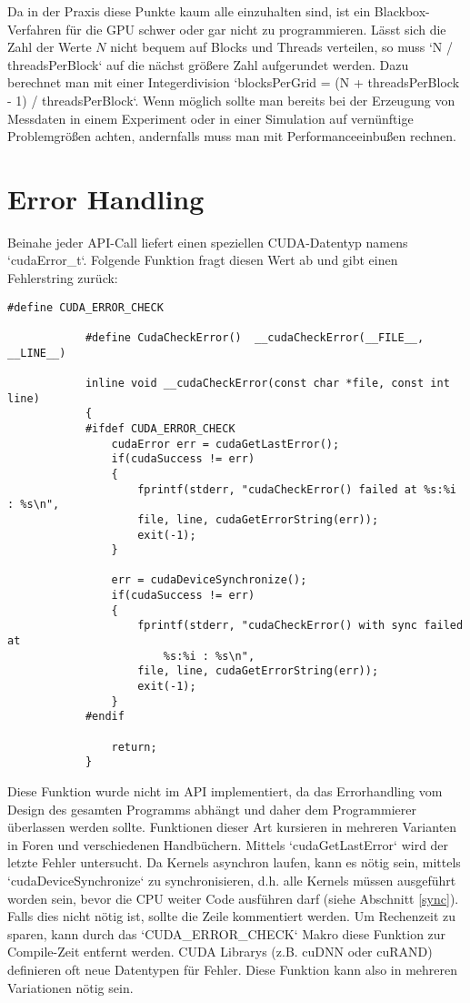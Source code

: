         Da in der Praxis diese Punkte kaum alle einzuhalten sind, ist ein Blackbox-Verfahren für die GPU schwer oder gar nicht zu programmieren. Lässt sich die Zahl der Werte $N$ nicht bequem auf \Glspl{Block} und \Glspl{Thread} verteilen, so muss \li`N / threadsPerBlock` auf die nächst größere Zahl aufgerundet werden. Dazu berechnet man mit einer Integerdivision \li`blocksPerGrid = (N + threadsPerBlock - 1) / threadsPerBlock`. Wenn möglich sollte man bereits bei der Erzeugung von Messdaten in einem Experiment oder in einer Simulation auf vernünftige Problemgrößen achten, andernfalls muss man mit \Gls{Performance}einbußen rechnen.
        								
		\section{Error Handling}
		Beinahe jeder \Gls{API}-Call liefert einen speziellen CUDA-Datentyp namens \li`cudaError_t`. Folgende Funktion fragt diesen Wert ab und gibt einen Fehlerstring zurück:		
		\begin{lstlisting}[caption=~Error Handling]
			#define CUDA_ERROR_CHECK

			#define CudaCheckError()  __cudaCheckError(__FILE__, __LINE__)

			inline void __cudaCheckError(const char *file, const int line)
			{
			#ifdef CUDA_ERROR_CHECK
				cudaError err = cudaGetLastError();
				if(cudaSuccess != err)
				{
					fprintf(stderr, "cudaCheckError() failed at %s:%i : %s\n",
					file, line, cudaGetErrorString(err));
					exit(-1);
				}

    			err = cudaDeviceSynchronize();
    			if(cudaSuccess != err)
    			{
        			fprintf(stderr, "cudaCheckError() with sync failed at 
        				%s:%i : %s\n",
					file, line, cudaGetErrorString(err));
					exit(-1);
				}
			#endif

				return;
			}
		\end{lstlisting}
		
		Diese Funktion wurde nicht im \Gls{API} implementiert, da das Errorhandling vom Design des gesamten Programms abhängt und daher dem Programmierer überlassen werden sollte. Funktionen dieser Art kursieren in mehreren Varianten in Foren und verschiedenen Handbüchern. Mittels \li`cudaGetLastError` wird der letzte Fehler untersucht. Da \Glspl{Kernel} asynchron laufen, kann es nötig sein, mittels \li`cudaDeviceSynchronize` zu synchronisieren, d.h. alle \Glspl{Kernel} müssen ausgeführt worden sein, bevor die CPU weiter Code ausführen darf (siehe Abschnitt \ref{sync}). Falls dies nicht nötig ist, sollte die Zeile kommentiert werden. Um Rechenzeit zu sparen, kann durch das \li`CUDA_ERROR_CHECK` Makro diese Funktion zur Compile-Zeit entfernt werden. CUDA Librarys (z.B. cuDNN oder cuRAND) definieren oft neue Datentypen für Fehler. Diese Funktion kann also in mehreren Variationen nötig sein.


